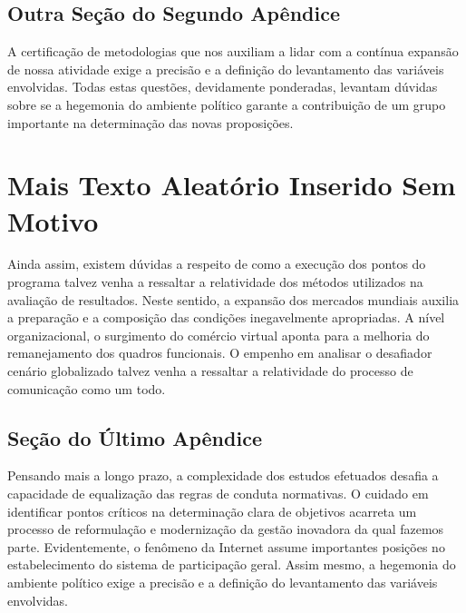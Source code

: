 \documentclass[fleqn]{icat-ufal}
\begin{document}
\section{Outra Seção do Segundo Apêndice}
\label{sec:outra_secao_do_segundo_apendice}

A certificação de metodologias que nos auxiliam a lidar com a contínua expansão
de nossa atividade exige a precisão e a definição do levantamento das variáveis
envolvidas. Todas estas questões, devidamente ponderadas, levantam dúvidas sobre
se a hegemonia do ambiente político garante a contribuição de um grupo
importante na determinação das novas proposições. 

\chapter{Mais Texto Aleatório Inserido Sem Motivo}
\label{cap:ultimo_apendice}

Ainda assim, existem dúvidas a respeito de como a execução dos pontos do
programa talvez venha a ressaltar a relatividade dos métodos utilizados na
avaliação de resultados. Neste sentido, a expansão dos mercados mundiais auxilia
a preparação e a composição das condições inegavelmente apropriadas. A nível
organizacional, o surgimento do comércio virtual aponta para a melhoria do
remanejamento dos quadros funcionais. O empenho em analisar o desafiador cenário
globalizado talvez venha a ressaltar a relatividade do processo de comunicação
como um todo. 

\section{Seção do Último Apêndice}
\label{sec:secao_do_ultimo_apendice}

Pensando mais a longo prazo, a complexidade dos estudos efetuados desafia a
capacidade de equalização das regras de conduta normativas. O cuidado em
identificar pontos críticos na determinação clara de objetivos acarreta um
processo de reformulação e modernização da gestão inovadora da qual fazemos
parte. Evidentemente, o fenômeno da Internet assume importantes posições no
estabelecimento do sistema de participação geral. Assim mesmo, a hegemonia do
ambiente político exige a precisão e a definição do levantamento das variáveis
envolvidas. 
\end{document}
